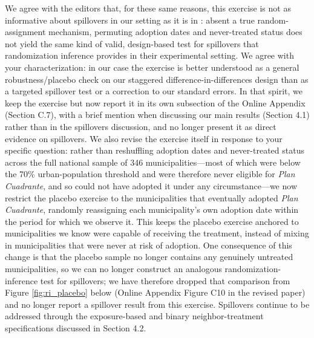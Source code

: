 We agree with the editors that, for these same reasons, this exercise is not as informative about spillovers in our setting as it is in \citet{Blattman_Tobon_JEEA}: absent a true random-assignment mechanism, permuting adoption dates and never-treated status does not yield the same kind of valid, design-based test for spillovers that randomization inference provides in their experimental setting. We agree with your characterization: in our case the exercise is better understood as a general robustness/placebo check on our staggered difference-in-differences design than as a targeted spillover test or a correction to our standard errors. In that spirit, we keep the exercise but now report it in its own subsection of the Online Appendix (Section C.7), with a brief mention when discussing our main results (Section 4.1) rather than in the spillovers discussion, and no longer present it as direct evidence on spillovers. We also revise the exercise itself in response to your specific question: rather than reshuffling adoption dates and never-treated status across the full national sample of 346 municipalities---most of which were below the 70\% urban-population threshold and were therefore never eligible for \emph{Plan Cuadrante}, and so could not have adopted it under any circumstance---we now restrict the placebo exercise to the municipalities that eventually adopted \emph{Plan Cuadrante}, randomly reassigning each municipality's own adoption date within the period for which we observe it. This keeps the placebo exercise anchored to municipalities we know were capable of receiving the treatment, instead of mixing in municipalities that were never at risk of adoption. One consequence of this change is that the placebo sample no longer contains any genuinely untreated municipalities, so we can no longer construct an analogous randomization-inference test for spillovers; we have therefore dropped that comparison from Figure \ref{fig:ri_placebo} below (Online Appendix Figure C10 in the revised paper) and no longer report a spillover result from this exercise. Spillovers continue to be addressed through the exposure-based and binary neighbor-treatment specifications discussed in Section 4.2.



